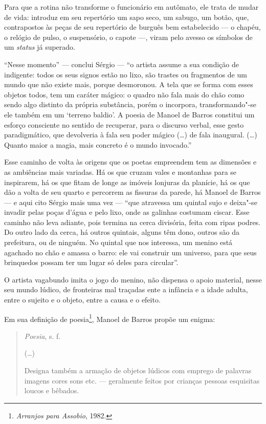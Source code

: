 {Para que a rotina não transforme o funcionário em autômato, ele trata de
mudar de vida: introduz em seu repertório um sapo seco, um sabugo, um
botão, que, contrapostos às peças de seu repertório de burguês bem
estabelecido --- o chapéu, o relógio de pulso, o suspensório, o capote
---, viram pelo avesso os símbolos de um \emph{status} já superado.

``Nesse momento'' --- conclui Sérgio --- ``o artista assume a sua condição
de indigente: todos os seus signos estão no lixo, são trastes ou
fragmentos de um mundo que não existe mais, porque desmoronou. A tela
que se forma com esses objetos todos, tem um caráter mágico: o quadro
não fala mais do chão como sendo algo distinto da própria substância,
porém o incorpora, transformando"-se ele também em um `terreno baldio'.
A poesia de Manoel de Barros constitui um esforço consciente no sentido
de recuperar, para o discurso verbal, esse gesto paradigmático, que
devolveria à fala seu poder mágico (\ldots{}) de fala inaugural. (\ldots{}) Quanto
maior a magia, mais concreto é o mundo invocado.''

Esse caminho de volta às origens que os poetas empreendem tem as
dimensões e as ambiências mais variadas. Há os que cruzam vales e
montanhas para se inspirarem, há os que fitam de longe as imóveis
lonjuras da planície, há os que dão a volta de seu quarto e percorrem as
fissuras da parede, há Manoel de Barros --- e aqui cito Sérgio mais uma
vez --- ``que atravessa um quintal sujo e deixa"-se invadir pelas poças
d'água e pelo lixo, onde as galinhas costumam ciscar. Esse caminho não
leva adiante, pois termina na cerca divisória, feita com ripas podres.
Do outro lado da cerca, há outros quintais, alguns têm dono, outros são
da prefeitura, ou de ninguém. No quintal que nos interessa, um menino
está agachado no chão e amassa o barro: ele vai construir um universo,
para que seus brinquedos possam ter um lugar só deles para circular''.

O artista vagabundo imita o jogo do menino, não dispensa o apoio
material, nesse seu mundo lúdico, de fronteiras mal traçadas ente a
infância e a idade adulta, entre o sujeito e o objeto, entre a causa e o
efeito.

Em sua definição de poesia\footnote{\emph{Arranjos para Assobio}, 1982.}, Manoel
de Barros propõe um enigma:

\begin{quote}
\emph{Poesia}, s. f.

(\ldots{})

Designa também a armação de objetos lúdicos
com emprego de palavras imagens cores sons
etc. --- geralmente feitos por crianças pessoas
esquisitas loucos e bêbados.
\end{quote}

}
